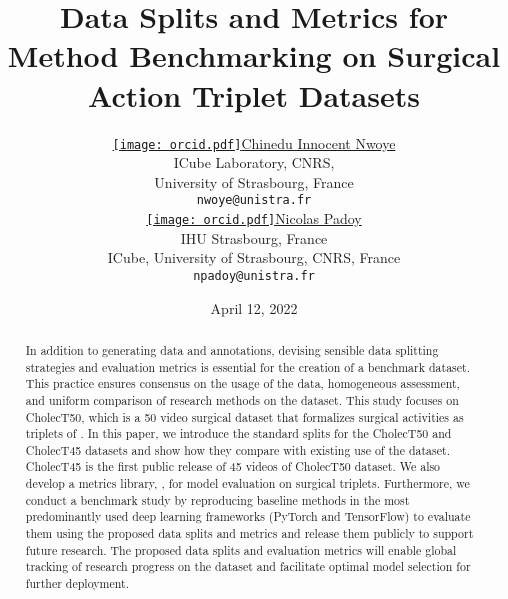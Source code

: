 \documentclass{article}
\title{Data Splits and Metrics for Method Benchmarking on Surgical Action Triplet Datasets}
\date{April 12, 2022}
\author{ 
\href{http://orcid.org/0000-0003-4777-0857}{\texttt{[image: orcid.pdf]}\hspace{1mm}Chinedu Innocent Nwoye}\\
	ICube Laboratory, CNRS,\\
	University of Strasbourg, France \\
	\texttt{nwoye@unistra.fr} \\
\And
	\href{https://orcid.org/0000-0002-5010-4137}{\texttt{[image: orcid.pdf]}\hspace{1mm}Nicolas Padoy} \\
	IHU Strasbourg, France\\
	ICube, University of Strasbourg, CNRS, France\\
\texttt{npadoy@unistra.fr} \\
}
\newcommand{\triplet}[1]{\textlangle{\textit{#1}}\textrangle{}}
\begin{document}
\maketitle

\begin{abstract}
In addition to generating data and annotations, devising sensible data splitting strategies and evaluation metrics is essential for the creation of a benchmark dataset. This practice ensures consensus on the usage of the data, homogeneous assessment, and uniform comparison of research methods on the dataset.
This study focuses on CholecT50, which is a 50 video surgical dataset that formalizes surgical activities as triplets of \triplet{instrument, verb, target}.
In this paper, we introduce the standard splits for the CholecT50 and CholecT45 datasets and show how they compare with existing use of the dataset. CholecT45 is the first public release of 45 videos of CholecT50 dataset.
We also develop a metrics library, , for model evaluation on surgical triplets.
Furthermore, we conduct a benchmark study by reproducing baseline methods in the most predominantly used deep learning frameworks (PyTorch and TensorFlow) to evaluate them using the proposed data splits and metrics and release them publicly to support future research.
The proposed data splits and evaluation metrics will enable global tracking of research progress on the dataset and facilitate optimal model selection for further deployment.
\end{abstract}
\end{document}
